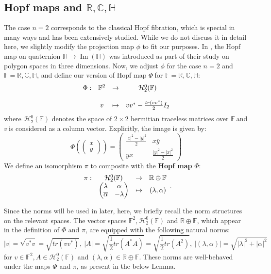 \documentclass[a4paper]{article}%
\begin{document}
\subsection{Hopf maps and $\mathbb{R},\mathbb{C},\mathbb{H}$}

The case $n=2$ corresponds to the classical Hopf fibration, which is special
in many ways and has been extensively studied. While we do not discuss it in
detail here, we slightly modify the projection map $\phi$ to fit our purposes.
In \cite{HK}, the Hopf map on quaternion $\mathbb{H}\rightarrow
\operatorname{Im}(\mathbb{H})$ was introduced as part of their study on
polygon spaces in three dimensions. Now, we adjust $\phi$ for the case $n=2$
and $\mathbb{F}=\mathbb{R},\mathbb{C},\mathbb{H}$, and define our version of
Hopf map $\Phi\ $for $\mathbb{F}=\mathbb{R},\mathbb{C},\mathbb{H}$:%
\[%
\begin{array}
[c]{cccc}%
\Phi: & \mathbb{F}^{2} & \rightarrow & \mathcal{H}_{2}^{0}(\mathbb{F})\\
&  &  & \\
& v & \mapsto & vv^{\ast}-\frac{tr(vv^{\ast})}{2}I_{2}%
\end{array}
\]
where $\mathcal{H}_{2}^{0}(\mathbb{F})$ denotes the space of $2\times2$
hermitian traceless matrices over $\mathbb{F\ }$and $v\ $is considered as a
column vector. Explicitly, the image is given by:
\[
\Phi\left(
\begin{pmatrix}
x\\
y
\end{pmatrix}
\right)  =%
\begin{pmatrix}
\frac{|x|^{2}-|y|^{2}}{2} & x\overline{y}\\
y\overline{x} & \frac{|y|^{2}-|x|^{2}}{2}%
\end{pmatrix}
\]
We define an isomorphism $\pi$ to composite with the \textbf{Hopf map} $\Phi$:%
\[%
\begin{array}
[c]{cccc}%
\pi: & \mathcal{H}_{2}^{0}(\mathbb{F}) & \rightarrow & \mathbb{R}%
\oplus\mathbb{F}\\
&
\begin{pmatrix}
\lambda & \alpha\\
\overline{\alpha} & -\lambda
\end{pmatrix}
& \mapsto & (\lambda,\alpha)
\end{array}
.
\]


Since the norms will be used in later, here, we briefly recall the norm
structures on the relevant spaces. The vector spaces $\mathbb{F}%
^{2},\mathcal{H}_{2}^{0}(\mathbb{F})$ and $\mathbb{R}\oplus\mathbb{F}$, which
appear in the definition of $\Phi$ and $\pi$, are equipped with the following
natural norms:
\[
|v|=\sqrt{v^{\ast}v}=\sqrt{tr(vv^{\ast})},\ |A|=\sqrt{\frac{1}{2}tr(A^{\ast
}A)}=\sqrt{\frac{1}{2}tr(A^{2})},\ |(\lambda,\alpha)|=\sqrt{|\lambda
|^{2}+|\alpha|^{2}}%
\]
for $v\in\mathbb{F}^{2},A\in\mathcal{H}_{2}^{0}(\mathbb{F})$ and
$(\lambda,\alpha)\in\mathbb{R}\oplus\mathbb{F}$. These norms are well-behaved
under the maps $\Phi$ and $\pi$, as present in the below Lemma.
\end{document}
